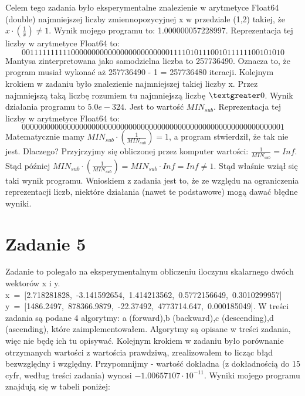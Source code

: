\documentclass[]{article}
\begin{document}
	Celem tego zadania było eksperymentalne znalezienie w arytmetyce Float64 (double) najmniejszej liczby zmiennopozycyjnej x w przedziale (1,2) takiej, że \(x \cdot (\frac{1}{x}) \neq 1\). 
	Wynik mojego programu to: 1.000000057228997. Reprezentacja tej liczby w arytmetyce Float64 to: \newline 
	$$0 01111111111 0000000000000000000000001111010111001011111100101010$$
	Mantysa zinterpretowana jako samodzielna liczba to 257736490. Oznacza to, że program musiał wykonać aż 257736490 - 1 = 257736480 iteracji.
	Kolejnym krokiem w zadaniu było znalezienie najmniejszej takiej liczby x. Przez najmniejszą taką liczbę rozumiem tu najmniejszą liczbę $\textgreater 0$. Wynik działania programu to $5.0e-324$. Jest to wartość $MIN_{sub}$.  Reprezentacja tej liczby w arytmetyce Float64 to: \newline 
	$$0 00000000000 0000000000000000000000000000000000000000000000000001$$
	Matematycznie mamy \( MIN_{sub} \cdot (\frac{1}{MIN_{sub}}) = 1\), a program stwierdził, że tak nie jest. Dlaczego? Przyjrzyjmy się obliczonej przez komputer wartości: $\frac{1}{MIN_{sub}} = Inf$. Stąd później $MIN_{sub} \cdot(\frac{1}{MIN_{sub}}) = MIN_{sub} \cdot Inf = Inf \ne 1$. Stąd właśnie wziął się taki wynik programu. Wnioskiem z zadania jest to, że ze względu na ograniczenia reprezentacji liczb, niektóre działania (nawet te podstawowe) mogą dawać błędne wyniki.
	
	
	\section*{Zadanie 5}
	Zadanie to polegało na eksperymentalnym obliczeniu iloczynu skalarnego dwóch wektorów x i y. \newline
	\mbox{x = [2.718281828, -3.141592654, 1.414213562, 0.5772156649, 0.3010299957]}\newline
	\mbox{y = [1486.2497, 878366.9879, -22.37492, 4773714.647, 0.000185049].}\newline
	W treści zadania są podane 4 algorytmy: \newline a (forward),b (backward),c (descending),d (ascending), które zaimplementowałem. Algorytmy są opisane w treści zadania, więc nie będę ich tu opisywać. Kolejnym krokiem w zadaniu było porównanie otrzymanych wartości z wartościa prawdziwą, zrealizowałem to licząc błąd bezwzględny i względny. Przypomnijmy - wartość dokładna (z dokładnością do 15 cyfr, według treści zadania) wynosi \(-1.00657107\cdot10^{-11}\). Wyniki mojego programu znajdują się w tabeli poniżej:
	
\end{document}
